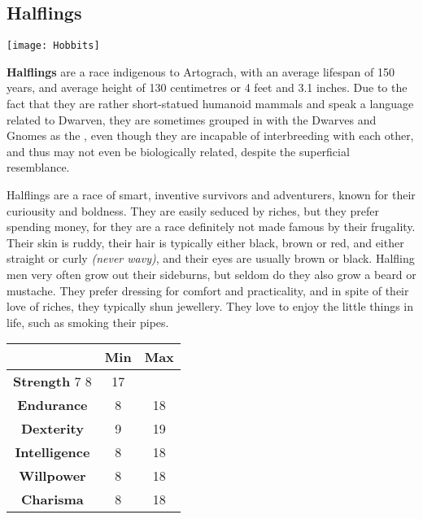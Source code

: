 \subsection{Halflings}


\texttt{[image: Hobbits]}


\textbf{Halflings} are a race indigenous to Artograch, with an average lifespan of 150 years, and average height of 130 centimetres or 4 feet and 3.1 inches. Due to the fact that they are rather short-statued humanoid mammals and speak a language related to Dwarven, they are sometimes grouped in with the Dwarves and Gnomes as the , even though they are incapable of interbreeding with each other, and thus may not even be biologically related, despite the superficial resemblance.


Halflings are a race of smart, inventive survivors and adventurers, known for their curiousity and boldness. They are easily seduced by riches, but they prefer spending money, for they are a race definitely not made famous by their frugality. Their skin is ruddy, their hair is typically either black, brown or red, and either straight or curly \textit{(never wavy)}, and their eyes are usually brown or black. Halfling men very often grow out their sideburns, but seldom do they also grow a beard or mustache. They prefer dressing for comfort and practicality, and in spite of their love of riches, they typically shun jewellery. They love to enjoy the little things in life, such as smoking their pipes.


\begin{tabular}{|c|c|c|}
\hline
 & \textbf{Min} & \textbf{Max} \\ \hline
\textbf{Strength} 7 8 & 17 \\ \hline
\textbf{Endurance} & 8 & 18 \\ \hline
\textbf{Dexterity} & 9 & 19 \\ \hline
\textbf{Intelligence} & 8 & 18 \\ \hline
\textbf{Willpower} & 8 & 18 \\ \hline
\textbf{Charisma} & 8 & 18 \\ \hline
\end{tabular}


 \newpage
